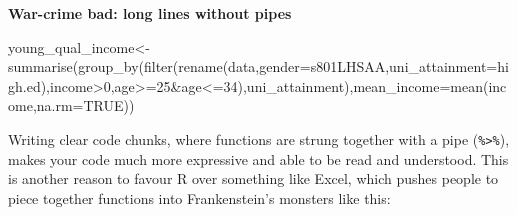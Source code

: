 \documentclass[
]{book}
\newenvironment{Shaded}{\begin{snugshade}}{\end{snugshade}}
\newcommand{\AttributeTok}[1]{\textcolor[rgb]{0.77,0.63,0.00}{#1}}
\newcommand{\ConstantTok}[1]{\textcolor[rgb]{0.00,0.00,0.00}{#1}}
\newcommand{\DecValTok}[1]{\textcolor[rgb]{0.00,0.00,0.81}{#1}}
\newcommand{\ErrorTok}[1]{\textcolor[rgb]{0.64,0.00,0.00}{\textbf{#1}}}
\newcommand{\FunctionTok}[1]{\textcolor[rgb]{0.00,0.00,0.00}{#1}}
\newcommand{\NormalTok}[1]{#1}
\newcommand{\OtherTok}[1]{\textcolor[rgb]{0.56,0.35,0.01}{#1}}
\newcommand{\SpecialCharTok}[1]{\textcolor[rgb]{0.00,0.00,0.00}{#1}}
\newcommand{\StringTok}[1]{\textcolor[rgb]{0.31,0.60,0.02}{#1}}
\begin{document}
\textbf{War-crime bad: long lines without pipes}

\begin{Shaded}
\begin{Highlighting}[]
\NormalTok{young\_qual\_income}\OtherTok{\textless{}{-}}\FunctionTok{summarise}\NormalTok{(}\FunctionTok{group\_by}\NormalTok{(}\FunctionTok{filter}\NormalTok{(}\FunctionTok{rename}\NormalTok{(data,}\AttributeTok{gender=}\NormalTok{s801LHSAA,}\AttributeTok{uni\_attainment=}\NormalTok{high.ed),income}\SpecialCharTok{\textgreater{}}\DecValTok{0}\NormalTok{,age}\SpecialCharTok{\textgreater{}=}\DecValTok{25}\SpecialCharTok{\&}\NormalTok{age}\SpecialCharTok{\textless{}=}\DecValTok{34}\NormalTok{),uni\_attainment),}\AttributeTok{mean\_income=}\FunctionTok{mean}\NormalTok{(income,}\AttributeTok{na.rm=}\ConstantTok{TRUE}\NormalTok{))}
\end{Highlighting}
\end{Shaded}

Writing clear code chunks, where functions are strung together with a pipe (\texttt{\%\textgreater{}\%}), makes your code much more expressive and able to be read and understood. This is another reason to favour R over something like Excel, which pushes people to piece together functions into Frankenstein's monsters like this:

\begin{Shaded}
\end{Shaded}
\end{document}
